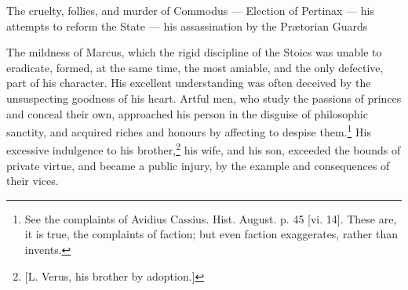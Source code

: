 
The cruelty, follies, and murder of Commodus \texthebrew{—} Election of Pertinax \texthebrew{—} his attempts to reform the State \texthebrew{—} his assassination by the Prætorian Guards

The mildness of Marcus, which the rigid discipline of the Stoics was unable to eradicate, formed, at the same time, the most amiable, and the only defective, part of his character. His excellent understanding was often deceived by the unsuspecting goodness of his heart. Artful men, who study the passions of princes and conceal their own, approached his person in the disguise of philosophic sanctity, and acquired riches and honours by affecting to despise them.\footnote{See the complaints of Avidius Cassius. Hist. August. p. 45 [vi. 14]. These are, it is true, the complaints of faction; but even faction exaggerates, rather than invents.} His excessive indulgence to his brother,\footnote{[L. Verus, his brother by adoption.]} his wife, and his son, exceeded the bounds of private virtue, and became a public injury, by the example and consequences of their vices.

